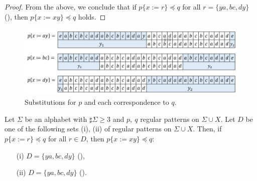 \begin{proof}
  \smallskip
  
  From the above, we conclude that if $p \{ x := r \} \preceq q$ for all $r = \{ ya, bc, dy \}$ (\TheConditionA), then $p \{ x := xy \} \preceq q$ holds.
  \end{proof}

\begin{figure}[t]
  \begin{center}
  \includegraphics[scale=0.45]{figs/Exam_b=a_c=d.png}
  \end{center}
  \caption{Substitutions for $p$ and each correspondence to $q$.}
  \label{b=aとc=dの例}
\end{figure}

\begin{lem}\label{片方}
Let $\Sigma$ be an alphabet with $\sharp\Sigma \ge 3$ and $p,~q$ regular patterns on $\Sigma\cup X$.
Let $D$ be one of the following sets \textrm{(i), (ii)} of regular patterns on $\Sigma\cup X$.
Then, if $p \{ x := r \} \preceq q$ for all $r \in D$, then $p \{ x := xy \} \preceq q$:
\begin{enumerate}
\item[{\rm (i)}] $D=\{ ya, bc, dy \}$ (\TheConditionB),
\item[{\rm (ii)}] $D=\{ ya, bc, dy \}$ (\theconditionC).
\end{enumerate}
\end{lem}

